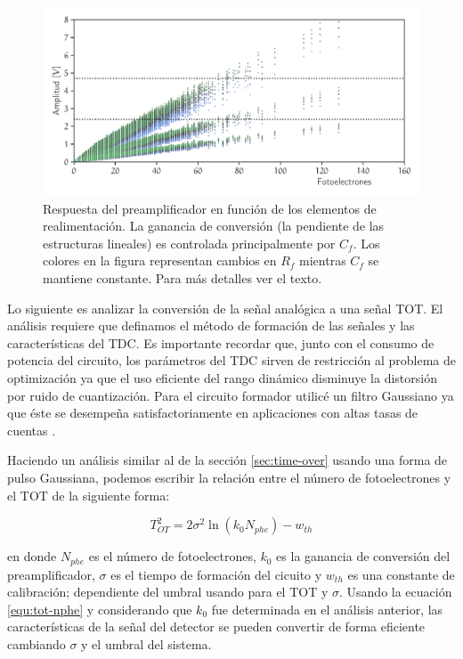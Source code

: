 \begin{figure}
        \centering
        \includegraphics[width=\textwidth]{phe-cal.pdf}
        \caption{Respuesta del preamplificador en función de los elementos de realimentación. La ganancia de conversión (la pendiente de las estructuras lineales) es controlada principalmente por $C_{f}$. Los colores en la figura representan cambios en $R_{f}$ mientras $C_{f}$ se mantiene constante. Para más detalles ver el texto.}
        \label{fig:phe-cal}
\end{figure}

Lo siguiente es analizar la conversión de la señal analógica a una señal TOT. El análisis requiere que definamos el método de formación de las señales y las características del TDC. Es importante recordar que,  junto con el consumo de potencia del circuito, los parámetros del TDC sirven de restricción al problema de optimización ya que el uso eficiente del rango dinámico disminuye la distorsión por ruido de cuantización. Para el circuito formador utilicé un filtro Gaussiano ya que éste se desempeña satisfactoriamente en aplicaciones con altas tasas de cuentas \cite{ohkawa76}.

Haciendo un análisis similar al de la sección \ref{sec:time-over} usando una forma de pulso Gaussiana, podemos escribir la relación entre el número de fotoelectrones y el TOT de la siguiente forma:

\begin{equation}
\label{equ:tot-nphe}
T_{OT}^{2}=2\sigma^{2}\ln{(k_{0} N_{phe})}-w_{th}
\end{equation}

en donde $N_{phe}$ es el número de fotoelectrones, $k_{0}$ es la ganancia de conversión del preamplificador, $\sigma$ es el tiempo de formación del cicuito y $w_{th}$ es una constante de calibración; dependiente del umbral usando para el TOT y $\sigma$. Usando la ecuación \ref{equ:tot-nphe} y considerando que $k_{0}$ fue determinada en el análisis anterior, las características de la señal del detector se pueden convertir de forma eficiente cambiando $\sigma$ y el umbral del sistema.

